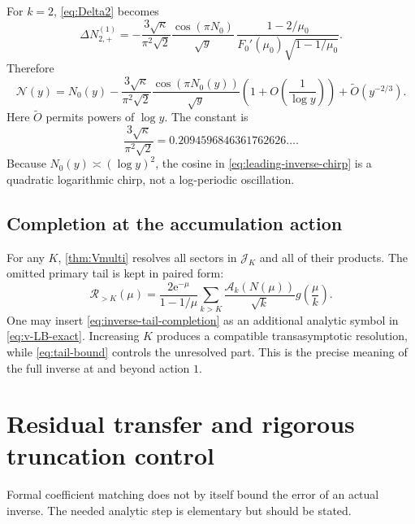 \documentclass[11pt,a4paper]{article}
\numberwithin{equation}{section}
\theoremstyle{definition}
\theoremstyle{remark}
\newcommand{\e}{\mathrm e}
\newcommand{\Acal}{\mathcal A}
\newcommand{\Ncal}{\mathcal N}
\newcommand{\Rcal}{\mathcal R}
\newcommand{\Jcal}{\mathcal J}
\begin{document}
For $k=2$, \eqref{eq:Delta2} becomes
\begin{equation}\label{eq:Delta2-y-exact}
 \Delta N_{2,+}^{(1)}=
 -\frac{3\sqrt\kappa}{\pi^2\sqrt2}
 \frac{\cos(\pi N_0)}{\sqrt y}\,
 \frac{1-2/\mu_0}
 {F_0'(\mu_0)\sqrt{1-1/\mu_0}}.
\end{equation}
Therefore
\begin{equation}\label{eq:leading-inverse-chirp}
 \boxed{
 \Ncal(y)=N_0(y)-
 \frac{3\sqrt\kappa}{\pi^2\sqrt2}
 \frac{\cos(\pi N_0(y))}{\sqrt y}
 \left(1+O\!\left(\frac1{\log y}\right)\right)
 +\widetilde O(y^{-2/3}).}
\end{equation}
Here $\widetilde O$ permits powers of $\log y$.  The constant is
\begin{equation}\label{eq:leading-constant}
 \frac{3\sqrt\kappa}{\pi^2\sqrt2}
 =0.2094596846361762626\ldots.
\end{equation}
Because $N_0(y)\asymp(\log y)^2$, the cosine in
\eqref{eq:leading-inverse-chirp} is a quadratic logarithmic chirp, not a
log-periodic oscillation.

\subsection{Completion at the accumulation action}

For any $K$, \cref{thm:Vmulti} resolves all sectors in $\Jcal_K$ and all of
their products.  The omitted primary tail is kept in paired form:
\begin{equation}\label{eq:inverse-tail-completion}
 \Rcal_{>K}(\mu)=
 \frac{2\e^{-\mu}}{1-1/\mu}
 \sum_{k>K}\frac{\Acal_k(N(\mu))}{\sqrt{k}}
 g\!\left(\frac\mu k\right).
\end{equation}
One may insert \eqref{eq:inverse-tail-completion} as an additional analytic
symbol in \eqref{eq:v-LB-exact}.  Increasing $K$ produces a compatible
transasymptotic resolution, while \eqref{eq:tail-bound} controls the unresolved
part.  This is the precise meaning of the full inverse at and beyond action
$1$.

\section{Residual transfer and rigorous truncation control}

Formal coefficient matching does not by itself bound the error of an actual
inverse.  The needed analytic step is elementary but should be stated.
\end{document}
